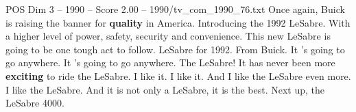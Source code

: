 \begin{textsample}{POS Dim 3 – 1990 – Score 2.00 – 1990/tv\_com\_1990\_76.txt}  \label{ex:f3_pos_074}
Once again, Buick is raising the banner for \textbf{quality} in America.
Introducing the 1992 LeSabre.
With a higher level of power, safety, security and convenience.
This new LeSabre is going to be one tough act to follow.
LeSabre for 1992.
From Buick.
It 's going to go anywhere.
It 's going to go anywhere.
The LeSabre!
It has never been more \textbf{exciting} to ride the LeSabre.
I like it.
I like it.
And I like the LeSabre even more.
I like the LeSabre.
And it is not only a LeSabre, it is the best.
Next up, the LeSabre 4000.

\end{textsample}
